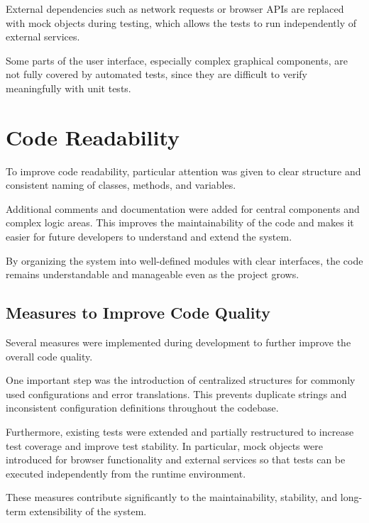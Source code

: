 External dependencies such as network requests or browser APIs are
replaced with mock objects during testing, which allows the tests to
run independently of external services.

Some parts of the user interface, especially complex graphical
components, are not fully covered by automated tests, since they are
difficult to verify meaningfully with unit tests.

\section{Code Readability}

To improve code readability, particular attention was given to clear
structure and consistent naming of classes, methods, and variables.

Additional comments and documentation were added for central
components and complex logic areas. This improves the maintainability
of the code and makes it easier for future developers to understand
and extend the system.

By organizing the system into well-defined modules with clear
interfaces, the code remains understandable and manageable even as
the project grows.

\subsection{Measures to Improve Code Quality}

Several measures were implemented during development to further improve
the overall code quality.

One important step was the introduction of centralized structures for
commonly used configurations and error translations. This prevents
duplicate strings and inconsistent configuration definitions
throughout the codebase.

Furthermore, existing tests were extended and partially restructured
to increase test coverage and improve test stability. In particular,
mock objects were introduced for browser functionality and external
services so that tests can be executed independently from the runtime
environment.

These measures contribute significantly to the maintainability,
stability, and long-term extensibility of the system.